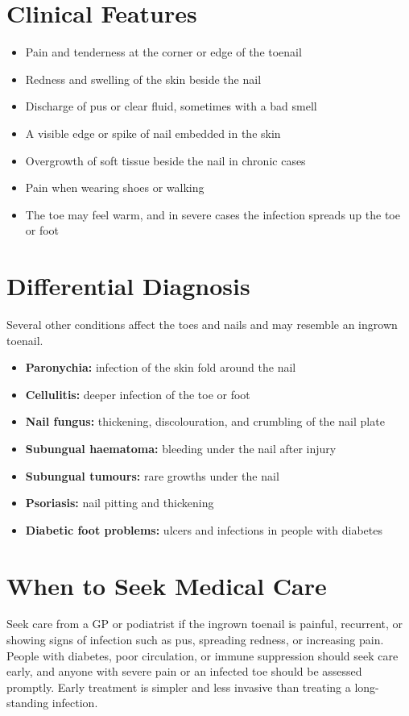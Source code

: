 \section*{Clinical Features}
\begin{itemize}
    \item Pain and tenderness at the corner or edge of the toenail
    \item Redness and swelling of the skin beside the nail
    \item Discharge of pus or clear fluid, sometimes with a bad smell
    \item A visible edge or spike of nail embedded in the skin
    \item Overgrowth of soft tissue beside the nail in chronic cases
    \item Pain when wearing shoes or walking
    \item The toe may feel warm, and in severe cases the infection spreads up the toe or foot
\end{itemize}

\section*{Differential Diagnosis}
Several other conditions affect the toes and nails and may resemble an ingrown toenail.
\begin{itemize}
    \item \textbf{Paronychia:} infection of the skin fold around the nail
    \item \textbf{Cellulitis:} deeper infection of the toe or foot
    \item \textbf{Nail fungus:} thickening, discolouration, and crumbling of the nail plate
    \item \textbf{Subungual haematoma:} bleeding under the nail after injury
    \item \textbf{Subungual tumours:} rare growths under the nail
    \item \textbf{Psoriasis:} nail pitting and thickening
    \item \textbf{Diabetic foot problems:} ulcers and infections in people with diabetes
\end{itemize}

\section*{When to Seek Medical Care}
Seek care from a GP or podiatrist if the ingrown toenail is painful, recurrent, or showing signs of infection such as pus, spreading redness, or increasing pain. People with diabetes, poor circulation, or immune suppression should seek care early, and anyone with severe pain or an infected toe should be assessed promptly. Early treatment is simpler and less invasive than treating a long-standing infection.

